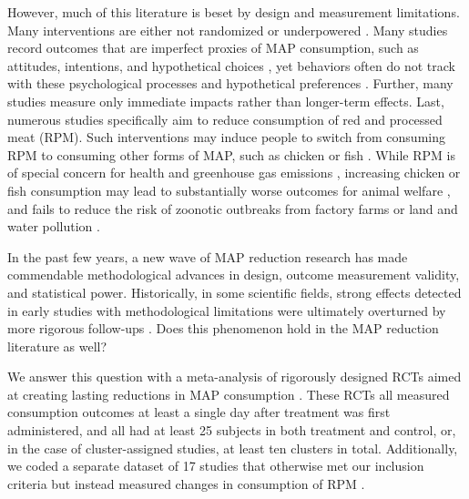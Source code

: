 \documentclass[sn-nature,referee,pdflatex]{sn-jnl}
\begin{document}
However, much of this literature is beset by design and measurement
limitations. Many interventions are either not randomized
\citep{garnett2020} or underpowered \citep{delichatsios2001}. Many
studies record outcomes that are imperfect proxies of MAP consumption,
such as attitudes, intentions, and hypothetical choices
\citep{raghoebar2020, vermeer2010}, yet behaviors often do not track
with these psychological processes
\citep{mathur2021effectiveness, porat2024} and hypothetical preferences
\citep{hensher2010}. Further, many studies measure only immediate
impacts \citep{hansen2021, griesoph2021} rather than longer-term
effects. Last, numerous studies specifically aim to reduce consumption
of red and processed meat (RPM). Such interventions may induce people to
switch from consuming RPM to consuming other forms of MAP, such as
chicken or fish \citep{grummon2023}. While RPM is of special concern for
health and greenhouse gas emissions \citep{abete2014, lescinsky2022},
increasing chicken or fish consumption may lead to substantially worse
outcomes for animal welfare \citep{mathur2022ethical}, and fails to
reduce the risk of zoonotic outbreaks from factory farms
\citep{hafez2020} or land and water pollution \citep{grvzinic2023}.

In the past few years, a new wave of MAP reduction research has made
commendable methodological advances in design, outcome measurement
validity, and statistical power. Historically, in some scientific
fields, strong effects detected in early studies with methodological
limitations were ultimately overturned by more rigorous follow-ups
\citep{wykes2008, paluck2019, scheel2021}. Does this phenomenon hold in
the MAP reduction literature as well?

We answer this question with a meta-analysis of rigorously designed RCTs
aimed at creating lasting reductions in MAP consumption
\citep{andersson2021, kanchanachitra2020, abrahamse2007, acharya2004, banerjee2019, bianchi2022, bochmann2017, bschaden2020, carfora2023, cooney2014, cooney2016, feltz2022, haile2021, hatami2018, hennessy2016, jalil2023, mathur2021effectiveness, merrill2009, norris2014, peacock2017, polanco2022, sparkman2021, weingarten2022, piester2020, aberman2018, aldoh2023, allen2002, camp2019, coker2022, sparkman2020, berndsen2005, bertolaso2015, fehrenbach2015, mattson2020, shreedhar2021}.
These RCTs all measured consumption outcomes at least a single day after
treatment was first administered, and all had at least 25 subjects in
both treatment and control, or, in the case of cluster-assigned studies,
at least ten clusters in total. Additionally, we coded a separate
dataset of 17 studies that otherwise met our inclusion criteria but
instead measured changes in consumption of RPM
\citep{anderson2017, carfora2017correlational, carfora2017randomised, carfora2019, carfora2019informational, delichatsios2001talking, dijkstra2022, emmons2005cancer, emmons2005project, jaacks2014, james2015, lee2018, lindstrom2015, perino2022, schatzkin2000, sorensen2005, wolstenholme2020}.
\end{document}
